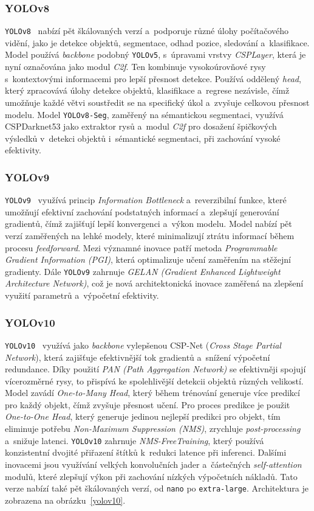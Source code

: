 \subsubsection*{YOLOv8}
\texttt{YOLOv8}~\cite{Terven} nabízí pět škálovaných verzí a~podporuje různé úlohy počítačového vidění, jako je detekce objektů, segmentace, odhad pozice, sledování a~klasifikace. Model používá \textit{backbone} podobný \texttt{YOLOv5}, s~úpravami vrstvy \textit{CSPLayer}, která je nyní označována jako modul \textit{C2f}. Ten kombinuje vysokoúrovňové rysy s~kontextovými informacemi pro lepší přesnost detekce. Používá oddělený \textit{head}, který zpracovává úlohy detekce objektů, klasifikace a~regrese nezávisle, čímž umožňuje každé větvi soustředit se na specifický úkol a~zvyšuje celkovou přesnost modelu. Model \texttt{YOLOv8-Seg}, zaměřený na sémantickou segmentaci, využívá CSPDarknet53 jako extraktor rysů a~modul \textit{C2f} pro dosažení špičkových výsledků v~detekci objektů i~sémantické segmentaci, při zachování vysoké efektivity.

\subsubsection*{YOLOv9}
\texttt{YOLOv9}~\cite{YOLO2024} využívá princip \textit{Information Bottleneck} a~reverzibilní funkce, které umožňují efektivní zachování podstatných informací a~zlepšují generování gradientů, čímž zajišťují lepší konvergenci a~výkon modelu. Model nabízí pět verzí zaměřených na lehké modely, které minimalizují ztrátu informací během procesu \textit{feedforward}. Mezi významné inovace patří metoda \textit{Programmable Gradient Information (PGI)}, která optimalizuje učení zaměřením na stěžejní gradienty. Dále \texttt{YOLOv9} zahrnuje \textit{GELAN (Gradient Enhanced Lightweight Architecture Network)}, což je nová architektonická inovace zaměřená na zlepšení využití parametrů a~výpočetní efektivity.

\subsubsection*{YOLOv10}
\texttt{YOLOv10}~\cite{YOLO2024} využívá jako \textit{backbone} vylepšenou CSP-Net (\textit{Cross Stage Partial Network}), která zajišťuje efektivnější tok gradientů a~snížení výpočetní redundance. Díky použití \textit{PAN (Path Aggregation Network)} se efektivněji spojují vícerozměrné rysy, to přispívá ke spolehlivější detekcii objektů různých velikostí. Model zavádí \textit{One-to-Many Head}, který během trénování generuje více predikcí pro každý objekt, čímž zvyšuje přesnost učení. Pro proces predikce je použit \textit{One-to-One Head}, který generuje jedinou nejlepší predikci pro objekt, tím eliminuje potřebu \textit{Non-Maximum Suppression (NMS)}, zrychluje \textit{post-processing} a~snižuje latenci. \texttt{YOLOv10} zahrnuje \textit{NMS-FreeTraining}, který používá konzistentní dvojité přiřazení štítků k~redukci latence při inferenci. Dalšími inovacemi jsou využívání velkých konvolučních jader a~částečných \textit{self-attention} modulů, které zlepšují výkon při zachování nízkých výpočetních nákladů. Tato verze nabízí také pět škálovaných verzí, od \texttt{nano} po \texttt{extra-large}. Architektura je zobrazena na obrázku~\ref{yolov10}.

